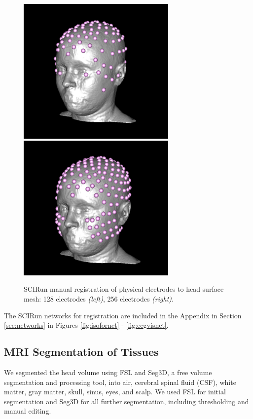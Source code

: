 \begin{figure}[H]
\begin{center}
\includegraphics[height = 2.84in]{Figures/128_eeg_reg}
\includegraphics[height = 2.84in]{Figures/256_eeg_reg}
\caption{SCIRun manual registration of physical electrodes to head surface mesh: 128 electrodes \textit{(left)}, 256 electrodes \textit{(right)}.}
\label{fig:eegreg}
\end{center}
\end{figure}

The SCIRun networks for registration are included in the Appendix in Section \ref{sec:networks} in Figures \ref{fig:isofornet} - \ref{fig:eegvisnet}.

\subsection{MRI Segmentation of Tissues}
\label{sec:Seg}


We segmented the head volume using FSL and Seg3D, a free volume segmentation and processing tool, \cite{ref:seg3d} into air, cerebral spinal fluid (CSF), white matter, gray matter, skull, sinus, eyes, and scalp. We used FSL for initial segmentation and Seg3D for all further segmentation, including thresholding and manual editing.

